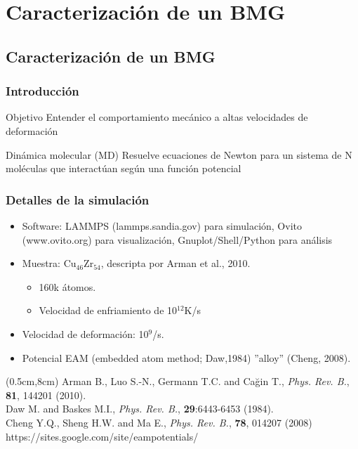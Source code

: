 
\section[Caracterizaci\'on]{Caracterizaci\'on de un BMG}
\subsection{Caracterizaci\'on de un BMG}

\begin{frame}
    \frametitle{Introducci\'on}
    \vspace{0.2cm}
    \begin{block}{Objetivo}
     Entender el comportamiento mec\'anico a altas velocidades de deformaci\'on
    \end{block}
    \vspace{1cm}
    \begin{block}{Din\'amica molecular (MD)}
    Resuelve ecuaciones de Newton para un sistema de N mol\'eculas que interact\'uan seg\'un una funci\'on potencial
    \end{block}
\end{frame}

\begin{frame}
    \frametitle{Detalles de la simulaci\'on}
    \vspace{0.1cm}
    \begin{itemize}
        \item Software: LAMMPS (lammps.sandia.gov) para simulaci\'on, Ovito (www.ovito.org) para visualizaci\'on, Gnuplot/Shell/Python para an\'alisis
        \item Muestra: Cu$_{46}$Zr$_{54}$, descripta por Arman et al., 2010.
        \begin{itemize}
	  \item 160k \'atomos.
	  \item Velocidad de enfriamiento de 10$^{12}$K/s 
        \end{itemize}
	\item Velocidad de deformaci\'on: 10$^9$/s.
	\item Potencial EAM (embedded atom method; Daw,1984) ''alloy'' (Cheng, 2008).
    \end{itemize}
    \begin{textblock*}{12cm}(0.5cm,8cm) %
        \scriptsize{Arman B., Luo S.-N., Germann T.C. and Cağin T., \textit{Phys. Rev. B.}, \textbf{81}, 144201 (2010).\\
        Daw M. and Baskes M.I., \textit{Phys. Rev. B.}, \textbf{29}:6443-6453 (1984).\\
        Cheng Y.Q., Sheng H.W. and Ma E., \textit{Phys. Rev. B.}, \textbf{78}, 014207 (2008) https://sites.google.com/site/eampotentials/}
    \end{textblock*}
\end{frame}

